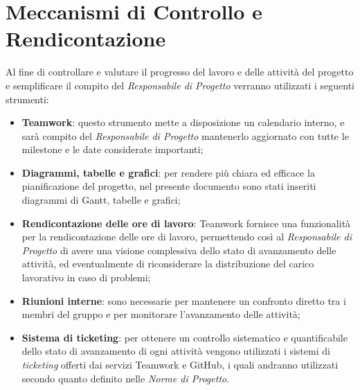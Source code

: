 \section {Meccanismi di Controllo e Rendicontazione}
Al fine di controllare e valutare il progresso del lavoro e delle
attività del progetto e semplificare il compito del \textit{Responsabile 
di Progetto} verranno utilizzati i seguenti strumenti:
\begin{itemize}
  \item \textbf{Teamwork}: questo strumento mette a disposizione
	un calendario interno, e sarà compito del \textit{Responsabile di Progetto}
	mantenerlo aggiornato con tutte le milestone e le date considerate importanti;
  \item \textbf{Diagrammi, tabelle e grafici}: per rendere più chiara ed efficace la pianificazione
	 del progetto, nel presente documento sono stati inseriti diagrammi di Gantt, tabelle e 
  	 grafici;
 
  \item \textbf{Rendicontazione delle ore di lavoro}: Teamwork fornisce una funzionalità
	per la rendicontazione delle ore di lavoro, permettendo così al \textit{Responsabile di Progetto}
	di avere una visione complessiva dello stato di avanzamento delle attività, ed eventualmente
	di riconsiderare la distribuzione del carico lavorativo in caso di problemi;

  \item \textbf{Riunioni interne}: sono necessarie per mantenere un confronto diretto tra i membri del gruppo
	e per monitorare l'avanzamento delle attività; 

  \item \textbf{Sistema  di ticketing}: per ottenere un controllo sistematico e quantificabile
   	 dello stato di avanzamento di ogni attività vengono utilizzati i sistemi di \textit{ticketing} 
  	 offerti dai servizi Teamwork e GitHub, 
  	 i quali andranno utilizzati secondo quanto definito nelle \textit{Norme di Progetto}.
\end{itemize}
